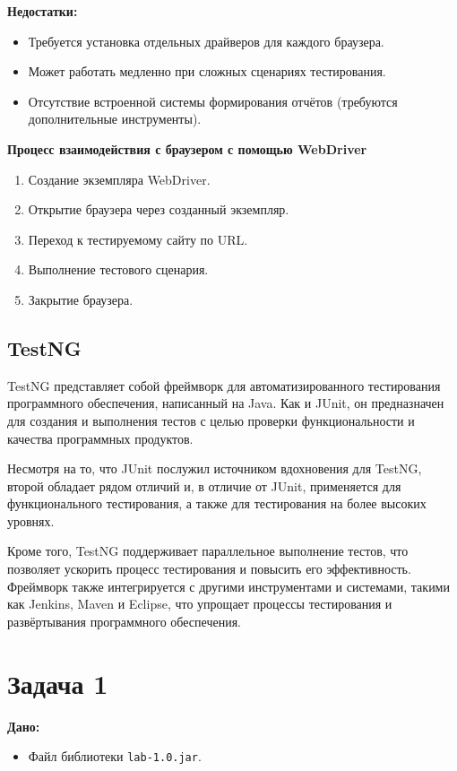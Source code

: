 \documentclass{article}[14pt]
\begin{document}
\textbf{Недостатки:}
\begin{itemize}
\item Требуется установка отдельных драйверов для каждого браузера.
\item Может работать медленно при сложных сценариях тестирования.
\item Отсутствие встроенной системы формирования отчётов (требуются дополнительные инструменты).
\end{itemize}

\noindent \textbf{Процесс взаимодействия с браузером с помощью WebDriver}
\begin{enumerate}
\item Создание экземпляра WebDriver.
\item Открытие браузера через созданный экземпляр.
\item Переход к тестируемому сайту по URL.
\item Выполнение тестового сценария.
\item Закрытие браузера.
\end{enumerate}

\subsection{TestNG}

TestNG представляет собой фреймворк для автоматизированного тестирования программного обеспечения, написанный на Java. Как и JUnit, он предназначен для создания и выполнения тестов с целью проверки функциональности и качества программных продуктов.

Несмотря на то, что JUnit послужил источником вдохновения для TestNG, второй обладает рядом отличий и, в отличие от JUnit, применяется для функционального тестирования, а также для тестирования на более высоких уровнях.

Кроме того, TestNG поддерживает параллельное выполнение тестов, что позволяет ускорить процесс тестирования и повысить его эффективность. Фреймворк также интегрируется с другими инструментами и системами, такими как Jenkins, Maven и Eclipse, что упрощает процессы тестирования и развёртывания программного обеспечения.

\pagebreak

\section{Задача 1}

\noindent \textbf{Дано:}
\begin{itemize}
\item Файл библиотеки \texttt{lab-1.0.jar}.
\end{itemize}
\end{document}
